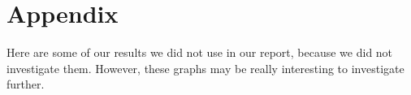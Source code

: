 \section*{Appendix} 

Here are some of our results we did not use in our report, because we did not investigate them.
However, these graphs may be really interesting to investigate further.

